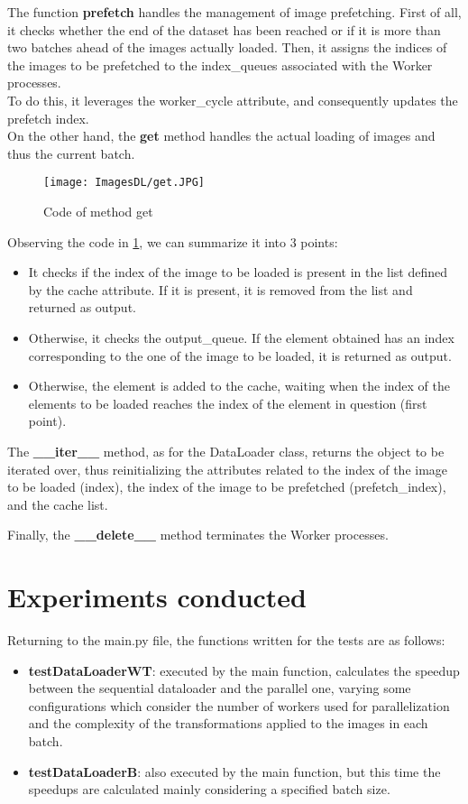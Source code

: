 \documentclass[10pt,twocolumn,letterpaper]{article}
\newcommand{\bit} {\begin{itemize} }
\newcommand{\eit} {\end{itemize} }
\begin{document}
The function \textbf{prefetch} handles the management of image prefetching. First of all, it checks whether the end of the dataset has been reached or if it is more than two batches ahead of the images actually loaded. Then, it assigns the indices of the images to be prefetched to the index\_queues associated with the Worker processes.\\
To do this, it leverages the worker\_cycle attribute, and consequently updates the prefetch index.\\
On the other hand, the \textbf{get} method handles the actual loading of images and thus the current batch.

\begin{figure}[h]
    \centering
    \texttt{[image: ImagesDL/get.JPG]}
    \caption{Code of method get}
    \label{fig:get}
\end{figure}


Observing the code in \cref{fig:get}, we can summarize it into 3 points:

\bit
    \item{It checks if the index of the image to be loaded is present in the list defined by the cache attribute. If it is present, it is removed from the list and returned as output.}
    \item{Otherwise, it checks the output\_queue. If the element obtained has an index corresponding to the one of the image to be loaded, it is returned as output.}
    \item{Otherwise, the element is added to the cache, waiting when the index of the elements to be loaded reaches the index of the element in question (first point).}
\eit

The \textbf{\_\_iter\_\_} method, as for the DataLoader class, returns the object to be iterated over, thus reinitializing the attributes related to the index of the image to be loaded (index), the index of the image to be prefetched (prefetch\_index), and the cache list.

Finally, the \textbf{\_\_delete\_\_} method terminates the Worker processes.

\section{Experiments conducted}
\label{sec:exp}

Returning to the main.py file, the functions written for the tests are as follows:

\bit
    \item{\textbf{testDataLoaderWT}: executed by the main function, calculates the speedup between the sequential dataloader and the parallel one, varying some configurations which consider the number of workers used for parallelization and the complexity of the transformations applied to the images in each batch.}
    \item{\textbf{testDataLoaderB}: also executed by the main function, but this time the speedups are calculated mainly considering a specified batch size.}
\eit
\end{document}
